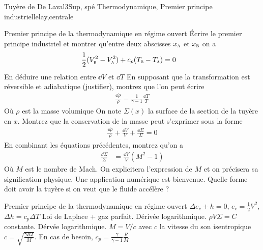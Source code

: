 \begin{exercise}{Tuyère de De Laval}{3}{Sup, spé}
{Thermodynamique, Premier principe industriel}{lelay,centrale}

\begin{questions}
    \questioncours Premier principe de la thermodynamique en régime ouvert
    \question Écrire le premier principe industriel et montrer qu'entre deux abscisses $x_\textsc{a}$ et $x_\textsc{b}$ on a 
    \begin{align*}
        \frac12 ( V_\textsc{b}^2 - V_\textsc{a}^2) + c_p (T_\textsc{b}-T_\textsc{a}) &= 0
    \end{align*}
    En déduire une relation entre $\dd{V}$ et $\dd{T}$
    \question En supposant que la transformation est réversible et adiabatique (justifier), montrez que l'on peut écrire
    \begin{align*}
        \frac{\dd{\rho}}{\rho} = \frac{1}{\gamma - 1}\frac{\dd{T}}{T}
    \end{align*}
    Où $\rho$ est la masse volumique
    \question On note $\Sigma(x)$ la surface de la section de la tuyère en $x$. Montrez que la conservation de la masse peut s'exprimer sous la forme
    \begin{align*}
        \frac{\dd{\rho}}{\rho} + \frac{\dd{V}}{V} + \frac{\dd{\Sigma}}{\Sigma} = 0
    \end{align*}
    \question En combinant les équations précédentes, montrez qu'on a 
    \begin{align*}
        \frac{\dd{\Sigma}}{\Sigma} &= \frac{\dd{V}}{V} ( M^2 - 1 )
    \end{align*}
    Où $M$ est le nombre de Mach. On explicitera l'expression de $M$ et on précisera sa signification physique. Une application numérique est bienvenue.
    \question Quelle forme doit avoir la tuyère si on veut que le fluide accélère ?
\end{questions}

\end{exercise}

\begin{solution}
\begin{questions}
    \questioncours Premier principe de la thermodynamique en régime ouvert
    \question $\Delta { e_c + h } = 0$, $e_c = \frac12 V^2$, $\Delta h = c_p \Delta T$
    \question Loi de Laplace + gaz parfait. Dérivée logarithmique.
    \question $\rho V \Sigma = C$ constante. Dérvée logarithmique.
    \question $M = V / c$ avec $c$ la vitesse du son isentropique $c = \sqrt{ \frac{\gamma R T}{M}}$. En cas de besoin, $c_p = \frac{\gamma}{\gamma - 1} \frac{R}{M}$
\end{questions}
\end{solution}